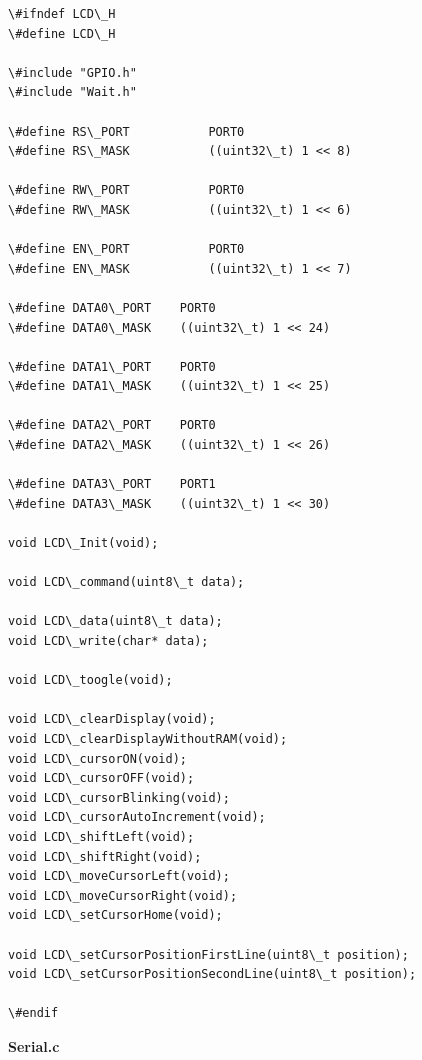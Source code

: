\documentclass{article}
\begin{document}
\begin{lstlisting}
\#ifndef LCD\_H
\#define LCD\_H

\#include "GPIO.h"
\#include "Wait.h"

\#define RS\_PORT			PORT0
\#define RS\_MASK			((uint32\_t) 1 << 8)

\#define RW\_PORT			PORT0
\#define RW\_MASK			((uint32\_t) 1 << 6)

\#define EN\_PORT			PORT0
\#define EN\_MASK			((uint32\_t) 1 << 7)

\#define DATA0\_PORT	PORT0
\#define DATA0\_MASK	((uint32\_t) 1 << 24)

\#define DATA1\_PORT	PORT0
\#define DATA1\_MASK	((uint32\_t) 1 << 25)

\#define DATA2\_PORT	PORT0
\#define DATA2\_MASK	((uint32\_t) 1 << 26)

\#define DATA3\_PORT	PORT1
\#define DATA3\_MASK	((uint32\_t) 1 << 30)

void LCD\_Init(void);

void LCD\_command(uint8\_t data);

void LCD\_data(uint8\_t data);
void LCD\_write(char* data);

void LCD\_toogle(void);

void LCD\_clearDisplay(void);
void LCD\_clearDisplayWithoutRAM(void);
void LCD\_cursorON(void);
void LCD\_cursorOFF(void);
void LCD\_cursorBlinking(void);
void LCD\_cursorAutoIncrement(void);
void LCD\_shiftLeft(void);
void LCD\_shiftRight(void);
void LCD\_moveCursorLeft(void);
void LCD\_moveCursorRight(void);
void LCD\_setCursorHome(void);

void LCD\_setCursorPositionFirstLine(uint8\_t position);
void LCD\_setCursorPositionSecondLine(uint8\_t position);

\#endif

\end{lstlisting}
\linebreak
\textbf{Serial.c}
\end{document}
